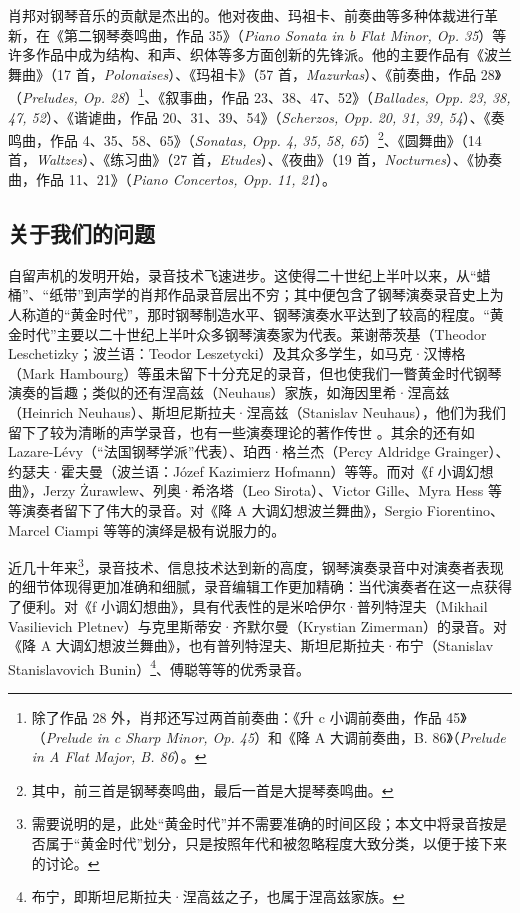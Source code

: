     肖邦对钢琴音乐的贡献是杰出的。他对夜曲、玛祖卡、前奏曲等多种体裁进行革新，在《第二钢琴奏鸣曲，作品 35》（\textit{Piano Sonata in b Flat Minor, Op. 35}）等许多作品中成为结构、和声、织体等多方面创新的先锋派。他的主要作品有《波兰舞曲》（17 首，\textit{Polonaises}）、《玛祖卡》（57 首，\textit{Mazurkas}）、《前奏曲，作品 28》（\textit{Preludes, Op. 28}）\footnote{除了作品 28 外，肖邦还写过两首前奏曲：《升 c 小调前奏曲，作品 45》（\textit{Prelude in c Sharp Minor, Op. 45}）和《降 A 大调前奏曲，B. 86》（\textit{Prelude in A Flat Major, B. 86}）。}、《叙事曲，作品 23、38、47、52》（\textit{Ballades, Opp. 23, 38, 47, 52}）、《谐谑曲，作品 20、31、39、54》（\textit{Scherzos, Opp. 20, 31, 39, 54}）、《奏鸣曲，作品 4、35、58、65》（\textit{Sonatas, Opp. 4, 35, 58, 65}）\footnote{其中，前三首是钢琴奏鸣曲，最后一首是大提琴奏鸣曲。}、《圆舞曲》（14 首，\textit{Waltzes}）、《练习曲》（27 首，\textit{Etudes}）、《夜曲》（19 首，\textit{Nocturnes}）、《协奏曲，作品 11、21》（\textit{Piano Concertos, Opp. 11, 21}）。\cite{workchopin}

    \subsection{\heiti \fontsize{15}{18} \selectfont 关于我们的问题}

    自留声机的发明开始，录音技术飞速进步。这使得二十世纪上半叶以来，从“蜡桶”、“纸带”到声学的肖邦作品录音层出不穷；其中便包含了钢琴演奏录音史上为人称道的“黄金时代”，那时钢琴制造水平、钢琴演奏水平达到了较高的程度。“黄金时代”主要以二十世纪上半叶众多钢琴演奏家为代表。莱谢蒂茨基（Theodor Leschetizky；波兰语：Teodor Leszetycki）及其众多学生，如马克·汉博格（Mark Hambourg）等虽未留下十分充足的录音，但也使我们一瞥黄金时代钢琴演奏的旨趣；类似的还有涅高兹（Neuhaus）家族，如海因里希·涅高兹（Heinrich Neuhaus）、斯坦尼斯拉夫·涅高兹（Stanislav Neuhaus），他们为我们留下了较为清晰的声学录音，也有一些演奏理论的著作传世 \cite{neuhaus}。其余的还有如 Lazare-Lévy（“法国钢琴学派”代表）、珀西·格兰杰（Percy Aldridge Grainger）、约瑟夫·霍夫曼（波兰语：Józef Kazimierz Hofmann）等等。而对《f 小调幻想曲》，Jerzy Żurawlew、列奥·希洛塔（Leo Sirota）、Victor Gille、Myra Hess 等等演奏者留下了伟大的录音。对《降 A 大调幻想波兰舞曲》，Sergio Fiorentino、Marcel Ciampi 等等的演绎是极有说服力的。

    近几十年来\footnote{需要说明的是，此处“黄金时代”并不需要准确的时间区段；本文中将录音按是否属于“黄金时代”划分，只是按照年代和被忽略程度大致分类，以便于接下来的讨论。}，录音技术、信息技术达到新的高度，钢琴演奏录音中对演奏者表现的细节体现得更加准确和细腻，录音编辑工作更加精确：当代演奏者在这一点获得了便利。对《f 小调幻想曲》，具有代表性的是米哈伊尔·普列特涅夫（Mikhail Vasilievich Pletnev）与克里斯蒂安·齐默尔曼（Krystian Zimerman）的录音。对《降 A 大调幻想波兰舞曲》，也有普列特涅夫、斯坦尼斯拉夫·布宁（Stanislav Stanislavovich Bunin）\cite{bunin}\footnote{布宁，即斯坦尼斯拉夫·涅高兹之子，也属于涅高兹家族。}、傅聪等等的优秀录音。

